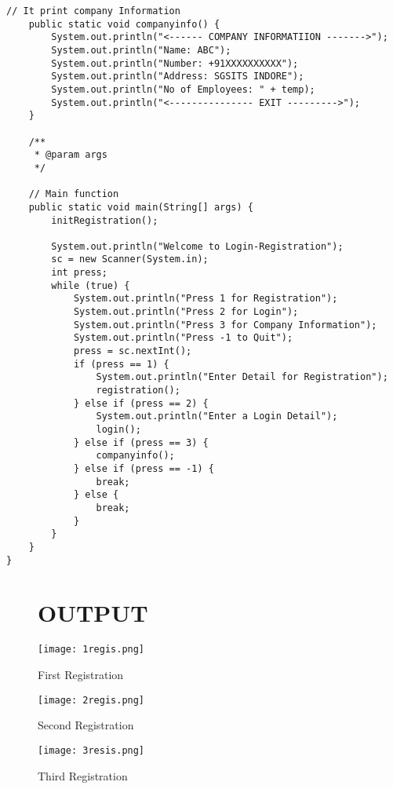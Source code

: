 \documentclass[12pt]{article}
\begin{document}
\begin{lstlisting}[]
   // It print company Information
    public static void companyinfo() {
        System.out.println("<------ COMPANY INFORMATIION ------->");
        System.out.println("Name: ABC");
        System.out.println("Number: +91XXXXXXXXXX");
        System.out.println("Address: SGSITS INDORE");
        System.out.println("No of Employees: " + temp);
        System.out.println("<--------------- EXIT --------->");
    }

    /**
     * @param args
     */

    // Main function
    public static void main(String[] args) {
        initRegistration();

        System.out.println("Welcome to Login-Registration");
        sc = new Scanner(System.in);
        int press;
        while (true) {
            System.out.println("Press 1 for Registration");
            System.out.println("Press 2 for Login");
            System.out.println("Press 3 for Company Information");
            System.out.println("Press -1 to Quit");
            press = sc.nextInt();
            if (press == 1) {
                System.out.println("Enter Detail for Registration");
                registration();
            } else if (press == 2) {
                System.out.println("Enter a Login Detail");
                login();
            } else if (press == 3) {
                companyinfo();
            } else if (press == -1) {
                break;
            } else {
                break;
            }
        }
    }
}

\end{lstlisting}

\pagebreak


 

\begin{figure}
\section*{\center OUTPUT}
	\centering
    \texttt{[image: 1regis.png]}
    \caption{First Registration}
    
\end{figure}

\begin{figure}
    \centering
    \texttt{[image: 2regis.png]}
    \caption{Second Registration}
\end{figure}

\begin{figure}
    \centering
    \texttt{[image: 3resis.png]}
    \caption{Third Registration}
\end{figure}
\end{document}

